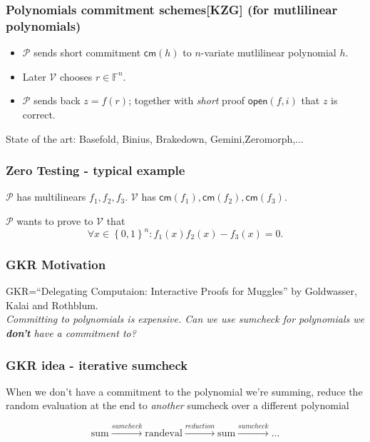\documentclass[shadesubsections,compress,14pt,mathserif]{beamer}
\newcommand{\F}{\ensuremath{{\mathbb F}}}
\newcommand{\set}[1]{\ensuremath{\left\{#1\right\}}}
\newcommand{\bin}{\ensuremath{\set{0,1}}}
\newcommand{\cube}{\ensuremath{\bin^n}}
\newcommand{\cm}{\ensuremath{\mathsf{cm}}}
\newcommand{\open}[1]{\ensuremath{\mathsf{open}(#1)}}
\newcommand{\ver}{\ensuremath{\mathcal{V}}}
\newcommand{\prv}{\ensuremath{\mathcal{P}}}
\newcommand{\nl}{\\ \pause \vspace{0.2in}}
\newcommand{\nlnp}{\\ \vspace{0.2in}}
\begin{document}
\begin{frame}
 \frametitle{Polynomials commitment schemes[KZG] (for mutlilinear polynomials)}
\begin{itemize}
 \item $\prv$ sends short commitment $\cm(h)$ to $n$-variate mutlilinear  polynomial $h$.\pause
 \item Later $\ver$  chooses  $r\in \F^n$.\pause
 \item $\prv$ sends back $z=f(r)$; together with \emph{short} proof $\open{f,i}$ that $z$ is correct.\pause
\end{itemize}
 State of the art: Basefold, Binius, Brakedown, Gemini,Zeromorph,...
\end{frame}

\begin{frame}
 \frametitle{ Zero Testing - typical example}
 $\prv$ has multilinears $f_1,f_2,f_3$. $\ver$ has $\cm(f_1),\cm(f_2),\cm(f_3)$.\nl
 
 $\prv$ wants to prove to $\ver$ that 
 \[\forall x\in\cube: f_1(x)f_2(x)-f_3(x) =0.\]
\end{frame}


\begin{frame}
\frametitle{GKR Motivation}   %
GKR=``Delegating Computaion: Interactive Proofs for Muggles'' by Goldwasser, Kalai and Rothblum.\nl
\emph{Committing to polynomials is expensive. Can we use sumcheck for polynomials we \textbf{don't} have a commitment to?}

\end{frame}
\begin{frame}
 \frametitle{GKR idea - iterative sumcheck}
 When we don't have a commitment to the polynomial we're summing, reduce the random evaluation at the end
 to \emph{another} sumcheck over a different polynomial\nlnp
 
 \[\mathrm{sum}\stackrel{sumcheck}{\to}\mathrm{rand eval} \stackrel{reduction}{\to}\mathrm{sum}\stackrel{sumcheck}{\to}\ldots\]
\end{frame}
\end{document}
